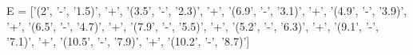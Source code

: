 \documentclass[preview]{standalone}
\begin{document}
\begin{center}
E = ['(2', '-', '1.5)', '+', '(3.5', '-', '2.3)', '+', '(6.9', '-', '3.1)', '+', '(4.9', '-', '3.9)', '+', '(6.5', '-', '4.7)', '+', '(7.9', '-', '5.5)', '+', '(5.2', '-', '6.3)', '+', '(9.1', '-', '7.1)', '+', '(10.5', '-', '7.9)', '+', '(10.2', '-', '8.7)']
\end{center}
\end{document}
